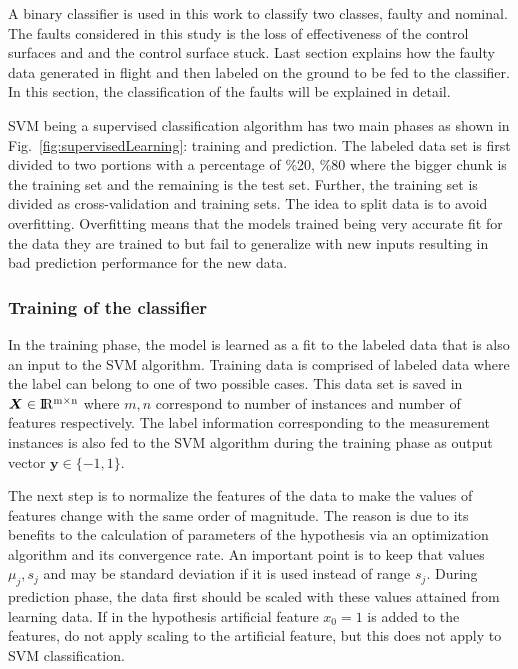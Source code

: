 A binary classifier is used in this work to classify two classes, faulty and nominal. 
The faults considered in this study is the loss of effectiveness of the control surfaces and and the control surface stuck. 
Last section explains how the faulty data generated in flight and then labeled on the ground to be fed to the classifier. 
In this section, the classification of the faults will be explained in detail. 

SVM being a supervised classification algorithm has two main phases as shown in Fig.~\ref{fig:supervisedLearning}: training and prediction. 
The labeled data set is first divided to two portions with a percentage of \%20, \%80 where the bigger chunk is the training set and the remaining is the test set. 
Further, the training set is divided as cross-validation and training sets. The idea to split data is to avoid overfitting. 
Overfitting means that the models trained being very accurate fit for the data they are trained to but fail to generalize with new inputs resulting in bad prediction performance for the new data. 

\subsubsection{Training of the classifier}
In the training phase, the model is learned as a fit to the labeled data that is also an input to the SVM algorithm. 
Training data is comprised of labeled data where the label can belong to one of two possible cases. 
This data set is saved in $\bm{X} \in {\rm I\!R^{m \times n}}  $ where $m,n$ correspond to number of instances and number of features respectively. 
The label information corresponding to the measurement instances is also fed to the SVM algorithm during the training phase as output vector $\bm{y} \in \{-1,1\}$. 

The next step is to normalize the features of the data to make the values of features change with the same order of magnitude. 
The reason is due to its benefits to the calculation of parameters of the hypothesis via an optimization algorithm and its convergence rate.  
An important point is to keep that values $\mu_j, s_j$ and may be standard deviation if it is used instead of range $s_j$. 
During prediction phase, the data first should be scaled with these values attained from learning data.
If in the hypothesis artificial feature  $x_0 = 1$ is added to the features, do not apply scaling to the artificial feature, but this does not apply to SVM classification.

